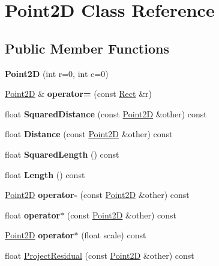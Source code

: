 \hypertarget{classPoint2D}{}\section{Point2\+D Class Reference}
\label{classPoint2D}
\subsection*{Public Member Functions}
\begin{DoxyCompactItemize}
\item 
\hypertarget{classPoint2D_ab6b269e58cadf99c3b290a43e04c9576}{}{\bfseries Point2\+D} (int r=0, int c=0)\label{classPoint2D_ab6b269e58cadf99c3b290a43e04c9576}

\item 
\hypertarget{classPoint2D_ab91688dc27a2072ab3efaf068c7a57e0}{}\hyperlink{classPoint2D}{Point2\+D} \& {\bfseries operator=} (const \hyperlink{classRect}{Rect} \&r)\label{classPoint2D_ab91688dc27a2072ab3efaf068c7a57e0}

\item 
\hypertarget{classPoint2D_a05def5ae8c585b81abacbbfab95ced7d}{}float {\bfseries Squared\+Distance} (const \hyperlink{classPoint2D}{Point2\+D} \&other) const \label{classPoint2D_a05def5ae8c585b81abacbbfab95ced7d}

\item 
\hypertarget{classPoint2D_a53134a6fffd5af2cc0e94267b1c50f4e}{}float {\bfseries Distance} (const \hyperlink{classPoint2D}{Point2\+D} \&other) const \label{classPoint2D_a53134a6fffd5af2cc0e94267b1c50f4e}

\item 
\hypertarget{classPoint2D_a9be8c903f8a7da91a2e02505050b09e1}{}float {\bfseries Squared\+Length} () const \label{classPoint2D_a9be8c903f8a7da91a2e02505050b09e1}

\item 
\hypertarget{classPoint2D_ad72551cf9211ad6045878f5661b04b45}{}float {\bfseries Length} () const \label{classPoint2D_ad72551cf9211ad6045878f5661b04b45}

\item 
\hypertarget{classPoint2D_af35a2cf89db69f6f26999377c11022e3}{}\hyperlink{classPoint2D}{Point2\+D} {\bfseries operator-\/} (const \hyperlink{classPoint2D}{Point2\+D} \&other) const \label{classPoint2D_af35a2cf89db69f6f26999377c11022e3}

\item 
\hypertarget{classPoint2D_acf19df4c89caf423fb2d67a750282dc2}{}float {\bfseries operator$\ast$} (const \hyperlink{classPoint2D}{Point2\+D} \&other) const \label{classPoint2D_acf19df4c89caf423fb2d67a750282dc2}

\item 
\hypertarget{classPoint2D_a24634097a05aee2737dbac56d50d97d5}{}\hyperlink{classPoint2D}{Point2\+D} {\bfseries operator$\ast$} (float scale) const \label{classPoint2D_a24634097a05aee2737dbac56d50d97d5}

\item 
float \hyperlink{classPoint2D_a6427afbb9fe1ee956b766c7d7230b44a}{Project\+Residual} (const \hyperlink{classPoint2D}{Point2\+D} \&other) const 
\end{DoxyCompactItemize}
